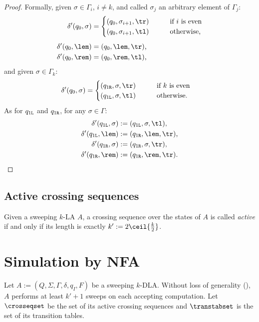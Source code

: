 \begin{proof}
	Formally, given $\sigma\in\Gamma_i$, $i\ne k$, and called $\sigma_j$ an arbitrary element of $\Gamma_j$:
	\begin{align*}
		\delta'(q_0,\sigma) & = \begin{cases}
			                        (q_0,\sigma_{i+1},\tr) \qquad & \text{if $i$ is even}   \\
			                        (q_0,\sigma_{i+1},\tl) \qquad & \text{otherwise} \text,
		                        \end{cases} \\[1ex]
		\delta'(q_0,\lem)   & = (q_0,\lem,\tr) \text,                                   \\
		\delta'(q_0,\rem)   & = (q_0,\rem,\tl) \text,
	\end{align*}
	and given $\sigma\in\Gamma_k$:
	\begin{align*}
		\delta'(q_0,\sigma) & = \begin{cases}
			                        (\qr,\sigma,\tr) \qquad & \text{if $k$ is even}   \\
			                        (\ql,\sigma,\tl) \qquad & \text{otherwise} \text.
		                        \end{cases}
	\end{align*}
	As for $q_{1\mathtt{L}}$ and $q_{1\mathtt{R}}$, for any $\sigma\in\Gamma$:
	\begin{align*}
		\delta'(\ql,\sigma) & :=(\ql,\sigma,\tl) \text,        \\
		\delta'(\ql,\lem)   & :=(\qr,\lem,\tr) \text,          \\
		\delta'(\qr,\sigma) & :=(\qr,\sigma,\tr) \text,        \\
		\delta'(\qr,\rem)   & :=(\qr,\rem,\tr) \text. \qedhere
	\end{align*}
\end{proof}


\subsection{Active crossing sequences}
\begin{defn}
	Given a sweeping $k$-LA $A$, a crossing sequence over the states of $A$ is called \emph{active} if and only if its length is exactly $k':=2\ceil{\frac{k}{2}}$.
\end{defn}


\section{Simulation by NFA}
Let $A:=(Q,\Sigma,\Gamma,\delta,q_I,F)$ be a sweeping $k$-DLA.
Without loss of generality (), $A$ performs at least $k'+1$ sweeps on each accepting computation.
Let $\crosseqset$ be the set of its active crossing sequences and $\transtabset$ is the set of its transition tables.

